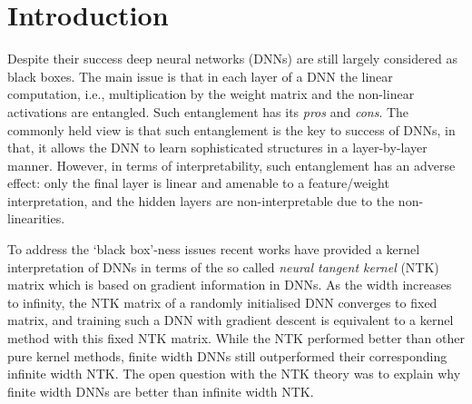 \section{Introduction}\label{sec:intro}
Despite their success deep neural networks (DNNs) are still largely considered as black boxes.  The main issue is that in each layer of a DNN the linear computation, i.e., multiplication by the weight matrix  and the non-linear activations are entangled. Such entanglement has its \emph{pros} and \emph{cons}. The commonly held view  is that such entanglement is the key to success of DNNs, in that, it allows the DNN to learn sophisticated structures in a layer-by-layer manner. However, in terms of interpretability, such entanglement has an adverse effect: only the final layer is linear and amenable to a feature/weight interpretation, and the hidden layers are non-interpretable due to the non-linearities. %

To address the `black box'-ness issues recent works have provided a kernel interpretation of DNNs \citep{ntk,arora2019exact,cao2019generalization} in terms of the so called \emph{neural tangent kernel} (NTK) matrix which is based on gradient information in DNNs. As the width increases to infinity, the NTK matrix of a randomly initialised DNN converges to fixed matrix, and training such a DNN with gradient descent is equivalent to a kernel method with this fixed NTK matrix. While the NTK performed better than other pure kernel methods, finite width DNNs still outperformed their corresponding infinite width NTK. The open question with the NTK theory was to explain why finite width DNNs are better than infinite width NTK.

